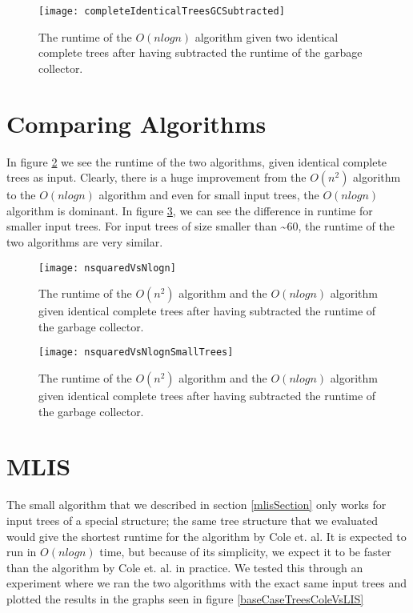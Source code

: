\begin{figure}
	\texttt{[image: completeIdenticalTreesGCSubtracted]}
	\caption{The runtime of the $O(nlogn)$ algorithm given two identical complete trees after having subtracted the runtime of the garbage collector.}
	\label{completeIdenticalTreesGCSubtractedGraph}
\end{figure}

\section{Comparing Algorithms}
In figure \ref{nsquaredVsNlognGraph} we see the runtime of the two algorithms, given identical complete trees as input. Clearly, there is a huge improvement from the $O(n^2)$ algorithm to the $O(nlogn)$ algorithm and even for small input trees, the $O(nlogn)$ algorithm is dominant. In figure \ref{nsquaredVsNlognSmallTreesGraph}, we can see the difference in runtime for smaller input trees. For input trees of size smaller than \textasciitilde 60, the runtime of the two algorithms are very similar.

\begin{figure}
	\texttt{[image: nsquaredVsNlogn]}
	\caption{The runtime of the $O(n^2)$ algorithm and the $O(nlogn)$ algorithm given identical complete trees after having subtracted the runtime of the garbage collector.}
	\label{nsquaredVsNlognGraph}
\end{figure}
\begin{figure}
	\texttt{[image: nsquaredVsNlognSmallTrees]}
	\caption{The runtime of the $O(n^2)$ algorithm and the $O(nlogn)$ algorithm given identical complete trees after having subtracted the runtime of the garbage collector.}
	\label{nsquaredVsNlognSmallTreesGraph}
\end{figure}

\section{MLIS}
The small algorithm that we described in section \ref{mlisSection} only works for input trees of a special structure; the same tree structure that we evaluated would give the shortest runtime for the algorithm by Cole et. al. It is expected to run in $O(nlogn)$ time, but because of its simplicity, we expect it to be faster than the algorithm by Cole et. al. in practice. We tested this through an experiment where we ran the two algorithms with the exact same input trees and plotted the results in the graphs seen in figure \ref{baseCaseTreesColeVsLIS}


